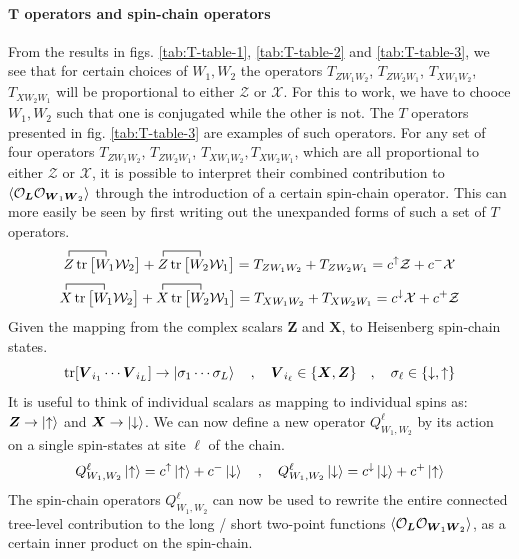 \paragraph[$T$ operators and spin-chain operators]{$\mathbf{T}$ operators and spin-chain operators}
From the results in figs. \ref{tab:T-table-1}, \ref{tab:T-table-2} and \ref{tab:T-table-3}, we see that for certain choices of $W_1,W_2$ the operators $T_{Z W_1 W_2}$, $T_{Z W_2 W_1}$, $T_{X W_1 W_2}$, $T_{X W_2 W_1}$ will be proportional to either $\mathcal{Z}$ or $\mathcal{X}$. For this to work, we have to chooce $W_1,W_2$ such that one is conjugated while the other is not. The $T$ operators presented in fig. \ref{tab:T-table-3} are examples of such operators. For any set of four operators $T_{Z W_1 W_2}$, $T_{Z W_2 W_1}$, $T_{X W_1 W_2},T_{X W_2 W_1}$, which are all proportional to either $\mathcal{Z}$ or $\mathcal{X}$, it is possible to interpret their combined contribution to $\expval{\mathcal{O}_{\boldsymbol{L}} \mathcal{O}_{\boldsymbol{W}_1 \boldsymbol{W}_2}}$ through the introduction of a certain spin-chain operator.
This can more easily be seen by first writing out the unexpanded forms of such a set of $T$ operators.
%
%
\begin{equation}
\contraction{}
{Z}
{ \tr \big[ }
{W_1}
Z \tr \big[ W_1 \mathcal{W}_2 \big]
+
\contraction{}
{Z}
{ \tr \big[ }
{W_2}
Z \tr \big[ W_2 \mathcal{W}_1 \big]
=
T_{Z W_1 W_2} + T_{Z W_2 W_1}
=
c^{\uparrow} \mathcal{Z} + c^{-} \mathcal{X}
\end{equation}
%
%
\begin{equation}
\contraction{}
{X}
{ \tr \big[ }
{W_1}
X \tr \big[ W_1 \mathcal{W}_2 \big]
+
\contraction{}
{X}
{ \tr \big[ }
{W_2}
X \tr \big[ W_2 \mathcal{W}_1 \big]
=
T_{X W_1 W_2} + T_{X W_2 W_1}
=
c^{\downarrow} \mathcal{X} + c^{+} \mathcal{Z}
\end{equation}
%
%
Given the mapping from the complex scalars $\boldsymbol{Z}$ and $\boldsymbol{X}$, to Heisenberg spin-chain states.
%
%
\begin{equation}\label{complex scalars to spin-states}
\tr[ \boldsymbol{V}_{i_1} \cdots \boldsymbol{V}_{i_L} ] \to \ket{\sigma_1 \cdots \sigma_L}
%
\quad , \quad
%
\boldsymbol{V}_{i_\ell} \in \{ \boldsymbol{X}, \boldsymbol{Z} \}
%
\quad , \quad
%
\sigma_\ell \in \{ \downarrow, \uparrow \}
\end{equation}
%
%
It is useful to think of individual scalars as mapping to individual spins as: $\boldsymbol{Z} \rightarrow \ket{\uparrow}$ and $\boldsymbol{X} \rightarrow \ket{\downarrow}$. We can now define a new operator $Q^{\ell}_{W_1,W_2}$ by its action on a single spin-states at site $\ell$ of the chain.
%
%
\begin{equation}
Q^{\ell}_{W_1,W_2} \ket{\uparrow}
=
c^{\uparrow} \ket{\uparrow} + c^{-} \ket{\downarrow}
%
\quad , \quad
%
Q^{\ell}_{W_1,W_2} \ket{\downarrow}
=
c^{\downarrow} \ket{\downarrow} + c^{+} \ket{\uparrow}
\end{equation}
%
%
The spin-chain operators $Q^{\ell}_{W_1,W_2}$ can now be used to rewrite the entire connected tree-level contribution to the long / short two-point functions $\expval{\mathcal{O}_{\boldsymbol{L}} \mathcal{O}_{\boldsymbol{W}_1 \boldsymbol{W}_2}}$, as a certain inner product on the spin-chain.

